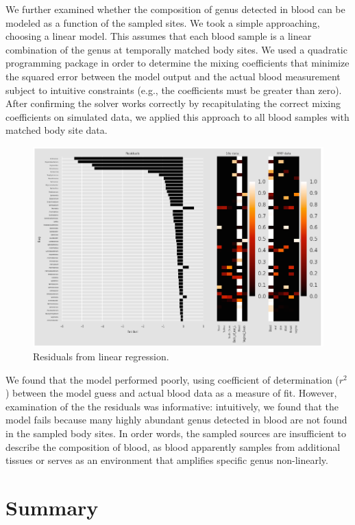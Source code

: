 We further examined whether the composition of genus detected in blood can be modeled as a function of the sampled sites. We took a simple approaching, choosing a linear model. This assumes that each blood sample is a linear combination of the genus at temporally matched body sites. We used a quadratic programming package in order to determine the mixing coefficients that minimize the squared error between the model output and the actual blood measurement subject to intuitive constraints (e.g., the coefficients must be greater than zero). After confirming the solver works correctly by recapitulating the correct mixing coefficients on simulated data, we applied this approach to all blood samples with matched body site data.

\begin{figure}
\center\includegraphics[width=150mm,scale=0.5]{Figures/Fig14_2}
\caption{Residuals from linear regression.}
\label{fig:Fig14_2}
\end{figure}

We found that the model performed poorly, using coefficient of determination ($r^2$) between the model guess and actual blood data as a measure of fit. However, examination of the the residuals was informative: intuitively, we found that the model fails because many highly abundant genus detected in blood are not found in the sampled body sites. In order words, the sampled sources are insufficient to describe the composition of blood, as blood apparently samples from additional tissues or serves as an environment that amplifies specific genus non-linearly.

\section{Summary}

